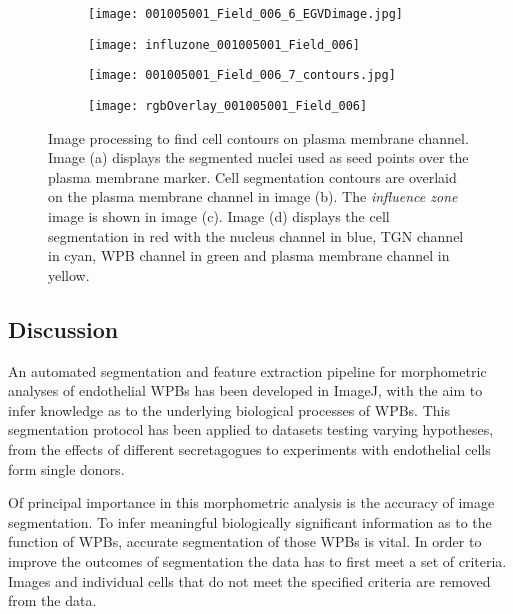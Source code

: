 \begin{figure}[htbp] 
	\begin{subfigure}[b]{0.49\linewidth}
		\centering
		\texttt{[image: 001005001\_Field\_006\_6\_EGVDimage.jpg]} 
		\caption{} 
		\label{pmChannel:a} 
		\vspace{1ex}
	\end{subfigure} 
	\begin{subfigure}[b]{0.49\linewidth}
		\centering
		\texttt{[image: influzone\_001005001\_Field\_006]} 
		\caption{} 
		\label{pmChannel:b} 
		\vspace{1ex}
	\end{subfigure}
	\begin{subfigure}[b]{0.49\linewidth}
		\centering
		\texttt{[image: 001005001\_Field\_006\_7\_contours.jpg]} 
		\caption{} 
		\label{pmChannel:c} 
	\end{subfigure} 
	\begin{subfigure}[b]{0.49\linewidth}
		\centering
		\texttt{[image: rgbOverlay\_001005001\_Field\_006]}
		\caption{} 
		\label{pmChannel:d} 
	\end{subfigure}
\caption{Image processing to find cell contours on plasma membrane channel. Image (a) displays the segmented nuclei used as seed points over the plasma membrane marker. Cell segmentation contours are overlaid on the plasma membrane channel in image (b). The \emph{influence zone} image is shown in image (c). Image (d) displays the cell segmentation in red with the nucleus channel in blue, TGN channel in cyan, WPB channel in green and plasma membrane channel in yellow.}
\label{pmChannel} 
\end{figure}

\subsection{Discussion}
An automated segmentation and feature extraction pipeline for morphometric analyses of endothelial WPBs has been developed in ImageJ, with the aim to infer knowledge as to the underlying biological processes of WPBs. This segmentation protocol has been applied to datasets testing varying hypotheses, from the effects of different secretagogues to experiments with endothelial cells form single donors.

Of principal importance in this morphometric analysis is the accuracy of image segmentation. To infer meaningful biologically significant information as to the function of WPBs, accurate segmentation of those WPBs is vital. In order to improve the outcomes of segmentation the data has to first meet a set of criteria. Images and individual cells that do not meet the specified criteria are removed from the data.

